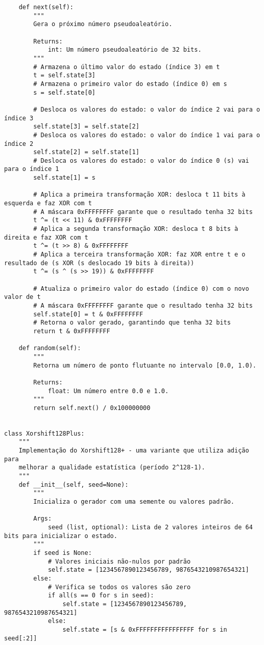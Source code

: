 \begin{verbatim}
    def next(self):
        """
        Gera o próximo número pseudoaleatório.
        
        Returns:
            int: Um número pseudoaleatório de 32 bits.
        """
        # Armazena o último valor do estado (índice 3) em t
        t = self.state[3]
        # Armazena o primeiro valor do estado (índice 0) em s
        s = self.state[0]
        
        # Desloca os valores do estado: o valor do índice 2 vai para o índice 3
        self.state[3] = self.state[2]
        # Desloca os valores do estado: o valor do índice 1 vai para o índice 2
        self.state[2] = self.state[1]
        # Desloca os valores do estado: o valor do índice 0 (s) vai para o índice 1
        self.state[1] = s
        
        # Aplica a primeira transformação XOR: desloca t 11 bits à esquerda e faz XOR com t
        # A máscara 0xFFFFFFFF garante que o resultado tenha 32 bits
        t ^= (t << 11) & 0xFFFFFFFF
        # Aplica a segunda transformação XOR: desloca t 8 bits à direita e faz XOR com t
        t ^= (t >> 8) & 0xFFFFFFFF
        # Aplica a terceira transformação XOR: faz XOR entre t e o resultado de (s XOR (s deslocado 19 bits à direita))
        t ^= (s ^ (s >> 19)) & 0xFFFFFFFF
        
        # Atualiza o primeiro valor do estado (índice 0) com o novo valor de t
        # A máscara 0xFFFFFFFF garante que o resultado tenha 32 bits
        self.state[0] = t & 0xFFFFFFFF
        # Retorna o valor gerado, garantindo que tenha 32 bits
        return t & 0xFFFFFFFF
    
    def random(self):
        """
        Retorna um número de ponto flutuante no intervalo [0.0, 1.0).
        
        Returns:
            float: Um número entre 0.0 e 1.0.
        """
        return self.next() / 0x100000000


class Xorshift128Plus:
    """
    Implementação do Xorshift128+ - uma variante que utiliza adição para
    melhorar a qualidade estatística (período 2^128-1).
    """
    def __init__(self, seed=None):
        """
        Inicializa o gerador com uma semente ou valores padrão.
        
        Args:
            seed (list, optional): Lista de 2 valores inteiros de 64 bits para inicializar o estado.
        """
        if seed is None:
            # Valores iniciais não-nulos por padrão
            self.state = [1234567890123456789, 9876543210987654321]
        else:
            # Verifica se todos os valores são zero
            if all(s == 0 for s in seed):
                self.state = [1234567890123456789, 9876543210987654321]
            else:
                self.state = [s & 0xFFFFFFFFFFFFFFFF for s in seed[:2]]
    

\end{verbatim}
